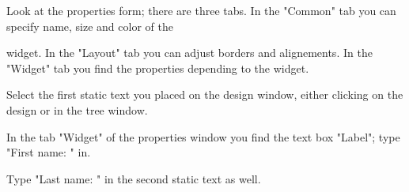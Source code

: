 \documentclass[a4paper,10pt]{book}
\begin{document}
                                                    
                                                    
                                                    
                                                    
                                                    Look at the properties form; there are three tabs. In the "Common"
                                                     tab you can specify name, size and color of the  
                                                    
                                                    
                                                    
                                                    
                                                    widget. In the "Layout" tab you can adjust borders and alignements.
                                                     In the "Widget" tab you find the properties depending to the
                                                     widget.
                                                    
                                                    
                                                    
                                                    
                                                    
                                                    Select the first static text you placed on the design window,
                                                     either clicking on the design or in the tree window.
                                                    
                                                    
                                                    
                                                    
                                                    In the tab "Widget" of the properties window you find the text
                                                     box "Label"; type "First name: " in.
                                                    
                                                    
                                                    
                                                    
                                                    Type "Last name: " in the second static text as well.
                                                    
\end{document}
